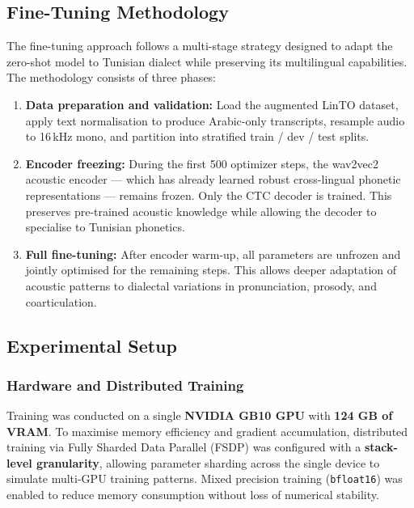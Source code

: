 \documentclass[12pt,a4paper]{report}
\begin{document}
\subsection{Fine-Tuning Methodology}

The fine-tuning approach follows a multi-stage strategy designed to adapt the
zero-shot model to Tunisian dialect while preserving its multilingual capabilities.
The methodology consists of three phases:

\begin{enumerate}
    \item \textbf{Data preparation and validation:} Load the augmented LinTO dataset,
    apply text normalisation to produce Arabic-only transcripts, resample audio to
    16\,kHz mono, and partition into stratified train / dev / test splits.

    \item \textbf{Encoder freezing:} During the first 500 optimizer steps, the wav2vec2
    acoustic encoder --- which has already learned robust cross-lingual phonetic
    representations --- remains frozen. Only the CTC decoder is trained. This preserves
    pre-trained acoustic knowledge while allowing the decoder to specialise to Tunisian
    phonetics.

    \item \textbf{Full fine-tuning:} After encoder warm-up, all parameters are unfrozen
    and jointly optimised for the remaining steps. This allows deeper adaptation of
    acoustic patterns to dialectal variations in pronunciation, prosody, and coarticulation.
\end{enumerate}

\subsection{Experimental Setup}

\subsubsection{Hardware and Distributed Training}

Training was conducted on a single \textbf{NVIDIA GB10 GPU} with \textbf{124 GB of VRAM}.
To maximise memory efficiency and gradient accumulation, distributed training via
Fully Sharded Data Parallel (FSDP) was configured with a \textbf{stack-level granularity},
allowing parameter sharding across the single device to simulate multi-GPU training patterns.
Mixed precision training (\texttt{bfloat16}) was enabled to reduce memory consumption
without loss of numerical stability.
\end{document}
